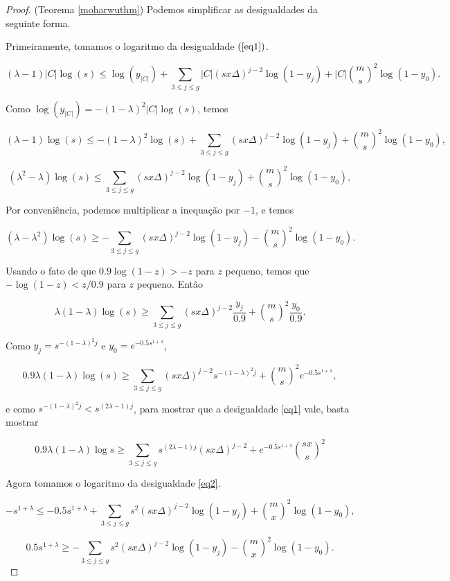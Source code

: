 \documentclass{article}
\begin{document}
\begin{proof}{(Teorema \ref{moharwuthm})}
Podemos simplificar as desigualdades da seguinte forma.

Primeiramente, tomamos o logaritmo da desigualdade $(\ref{eq1})$.

\[(\lambda-1)|C|\log(s) \leq \log(y_{|C|}) + \sum_{3\leq j\leq g} |C|(sx\Delta)^{j-2}\log(1-y_j)+|C|\binom{m}{s}^2\log(1-y_0).\]

Como $\log(y_{|C|}) = -(1-\lambda)^2|C|\log(s)$, temos

\[(\lambda-1)\log(s) \leq -(1-\lambda)^2\log(s)+\sum_{3\leq j\leq g} (sx\Delta)^{j-2}\log(1-y_j)+\binom{m}{s}^2\log(1-y_0),\]


\[(\lambda^2 - \lambda)\log(s) \leq \sum_{3\leq j\leq g} (sx\Delta)^{j-2}\log(1-y_j)+\binom{m}{s}^2\log(1-y_0),\]

Por conveniência, podemos multiplicar a inequação por $-1$, e temos

\[(\lambda - \lambda^2)\log(s) \geq -\sum_{3\leq j\leq g} (sx\Delta)^{j-2}\log(1-y_j)-\binom{m}{s}^2\log(1-y_0).\]

Usando o fato de que $0.9\log(1-z) > -z$ para $z$ pequeno, temos que $-\log(1-z) < z/0.9$ para $z$ pequeno. Então

\[\lambda(1 - \lambda)\log(s) \geq \sum_{3\leq j\leq g} (sx\Delta)^{j-2}\frac{y_j}{0.9}+\binom{m}{s}^2\frac{y_0}{0.9}.\]

Como $y_j = s^{-(1-\lambda)^{2}j}$ e $y_0 = e^{-0.5s^{1+\lambda}}$,

\[0.9\lambda(1 - \lambda)\log(s) \geq \sum_{3\leq j\leq g} (sx\Delta)^{j-2}s^{-(1-\lambda)^2j}+\binom{m}{s}^2e^{-0.5s^{1+\lambda}},\]

e como $s^{-(1-\lambda)^2j} < s^{(2\lambda - 1)j}$, para mostrar que a desigualdade \ref{eq1} vale, basta mostrar

\begin{equation}\label{eq3}
0.9\lambda(1-\lambda)\log s \geq \sum_{3\leq j\leq g}s^{(2\lambda-1)j}(sx\Delta)^{j-2}+e^{-0.5s^{1+\lambda}}\binom{sx}{s}^2
\end{equation}

Agora tomamos o logaritmo da desigualdade \ref{eq2}.

\[-s^{1+\lambda} \leq -0.5s^{1+\lambda} + \sum_{3\leq j \leq g} s^2(sx\Delta)^{j-2}\log(1-y_j) + \binom{m}{x}^2\log(1-y_0),\]

\[0.5s^{1+\lambda} \geq -\sum_{3\leq j \leq g} s^2(sx\Delta)^{j-2}\log(1-y_j) - \binom{m}{x}^2\log(1-y_0).\]


\end{proof}
\end{document}
